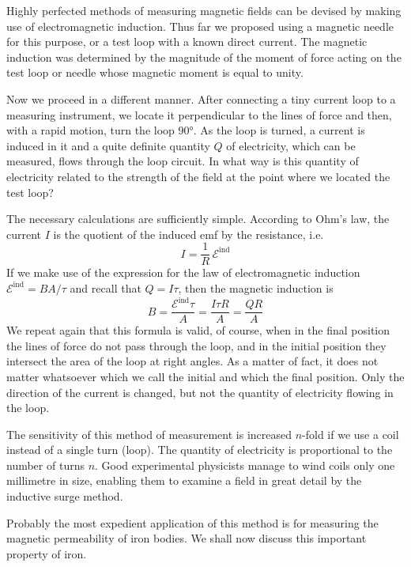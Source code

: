 Highly perfected methods of measuring magnetic fields can be devised by making use of electromagnetic induction. Thus far we proposed using a magnetic needle for this purpose, or a test loop with a known direct current. The magnetic induction was determined by the magnitude of the moment of force acting on the test loop or needle whose magnetic moment is equal to unity.

Now we proceed in a different manner. After connecting a tiny current loop to a measuring instrument, we locate it perpendicular to the lines of force and then, with a rapid motion, turn the loop \ang{90}. As the loop is turned, a current is induced in it and a quite definite quantity $Q$ of electricity, which can be measured, flows through the loop circuit. In what way is this quantity of electricity related to the strength of the field at the point where we located the test loop?

The necessary calculations are sufficiently simple. According to Ohm's law, the current $I$ is the quotient of the induced emf by the resistance, i.e.
\begin{equation*}%
I = \frac{1}{R} \, \mathcal{E}^{\textrm{ind}}
\end{equation*}
If we make use of the expression for the law of electromagnetic induction $\mathcal{E}^{\textrm{ind}} = BA/\tau$ and recall that $Q = I\tau$, then the magnetic induction is
\begin{equation*}%
B = \frac{\mathcal{E}^{\textrm{ind}} \tau}{A}  = \frac{I \tau R}{A} = \frac{QR}{A}
\end{equation*}
We repeat again that this formula is valid, of course, when in the final position the lines of force do not pass through the loop, and in the initial position they intersect the area of the loop at right angles. As a matter of fact, it does not matter whatsoever which we call the initial and which the final position. Only the direction of the current is changed, but not the quantity of electricity flowing in the loop.

The sensitivity of this method of measurement is increased $n$-fold if we use a coil instead of a single turn (loop). The quantity of electricity is proportional to the number of turns $n$. Good experimental physicists manage to wind coils only one millimetre in size, enabling them to examine a field in great detail by the inductive surge method.

Probably the most expedient application of this method is for measuring the magnetic permeability of iron bodies. We shall now discuss this important property of iron.

